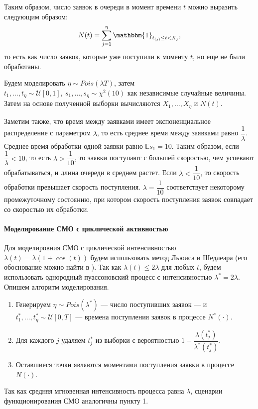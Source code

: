 \documentclass[16pt]{article}
\newcommand{\I}{\mathbbm{1}}
\begin{document}
Таким образом, число заявок в очереди в момент времени $t$ можно выразить следующим образом:
$$N(t) = \sum_{j=1}^{\eta}\I_{t_{(j)} \leq t < X_j},$$
то есть как число заявок, которые уже поступили к моменту $t$, но еще не были обработаны.

Будем моделировать $\eta \sim Pois(\lambda T)$, затем $t_1, \ldots, t_\eta \sim \mathcal{U}[0, 1],\ s_1, \ldots, s_\eta \sim \chi^2(10)$ как независимые случайные величины. Затем на основе полученной выборки вычисляются $X_1, \ldots, X_\eta$ и $N(t)$.

Заметим также, что время между заявками имеет экспоненциальное распределение с параметром $\lambda$, то есть среднее время между заявками равно $\dfrac{1}{\lambda}$. Среднее время обработки одной заявки равно $\mathbb{E}s_1 = 10$. Таким образом, если $\dfrac{1}{\lambda} < 10$, то есть $\lambda > \dfrac{1}{10}$, то заявки поступают с большей скоростью, чем успевают обрабатываться, и длина очереди в среднем растет.
Если $\lambda < \dfrac{1}{10}$, то скорость обработки превышает скорость поступления. $\lambda = \dfrac{1}{10}$ соответствует некоторому промежуточному состоянию,
при котором скорость поступления заявок совпадает со скоростью их обработки.

\paragraph{Моделирование СМО с циклической активностью}
Для моделировния СМО с циклической интенсивностью $\lambda(t) = \lambda(1 + \cos(t))$ будем использовать метод Льюиса и Шедлеара (его обоснование можно найти в \cite{Lewis}). Так как $\lambda(t) \leq 2\lambda$ для любых $t$, будем использовать однородный пуассоновский процесс с интенсивностью $\lambda^* = 2 \lambda$. Опишем алгоритм моделирования.

\begin{enumerate}
	\item Генерируем $\eta \sim Pois(\lambda^*)$ --- число поступивших заявок --- и $t_1^*, \ldots, t_\eta^* \sim \mathcal{U}[0, T]$ --- времена поступления заявок в процессе $N^*(\cdot)$.
	\item Для каждого $j$ удаляем $t_j^*$ из выборки с вероятностью $1 - \dfrac{\lambda(t_j^*)}{\lambda^*(t_j^*)}$.
	\item Оставшиеся точки являются моментами поступления заявки в процессе $N(\cdot)$.
\end{enumerate}

Так как средняя мгновенная интенсивность процесса равна $\lambda$, сценарии функционирования СМО аналогичны пункту 1.
\end{document}
